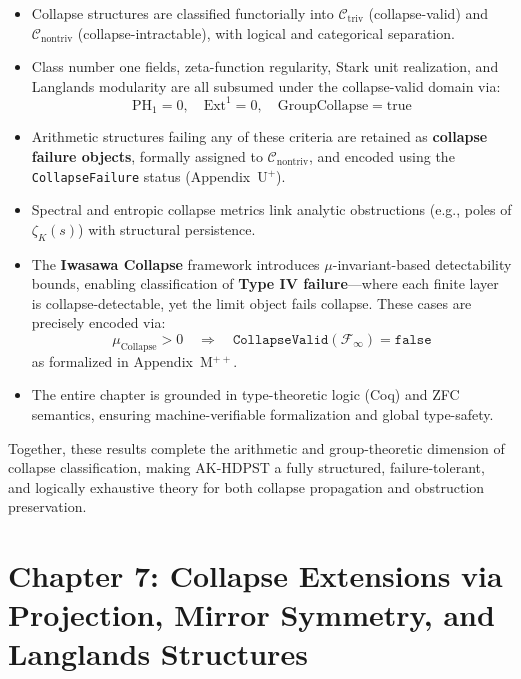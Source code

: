 \documentclass[11pt]{article}
\begin{document}
\begin{itemize}
    \item Collapse structures are classified functorially into \( \mathcal{C}_{\mathrm{triv}} \) (collapse-valid) and \( \mathcal{C}_{\mathrm{nontriv}} \) (collapse-intractable), with logical and categorical separation.
    \item Class number one fields, zeta-function regularity, Stark unit realization, and Langlands modularity are all subsumed under the collapse-valid domain via:
    \[
    \mathrm{PH}_1 = 0, \quad \mathrm{Ext}^1 = 0, \quad \mathrm{GroupCollapse} = \text{true}
    \]
    \item Arithmetic structures failing any of these criteria are retained as \textbf{collapse failure objects}, formally assigned to \( \mathcal{C}_{\mathrm{nontriv}} \), and encoded using the \texttt{CollapseFailure} status (Appendix~U$^+$).
    \item Spectral and entropic collapse metrics link analytic obstructions (e.g., poles of \( \zeta_K(s) \)) with structural persistence.
    \item The \textbf{Iwasawa Collapse} framework introduces $\mu$-invariant-based detectability bounds, enabling classification of \textbf{Type IV failure}—where each finite layer is collapse-detectable, yet the limit object fails collapse. These cases are precisely encoded via:
    \[
    \mu_{\mathrm{Collapse}} > 0 \quad \Rightarrow \quad \texttt{CollapseValid}(\mathcal{F}_\infty) = \texttt{false}
    \]
    as formalized in Appendix~M$^{++}$.
    \item The entire chapter is grounded in type-theoretic logic (Coq) and ZFC semantics, ensuring machine-verifiable formalization and global type-safety.
\end{itemize}

Together, these results complete the arithmetic and group-theoretic dimension of collapse classification, making AK-HDPST a fully structured, failure-tolerant, and logically exhaustive theory for both collapse propagation and obstruction preservation.



\section{Chapter 7: Collapse Extensions via Projection, Mirror Symmetry, and Langlands Structures}
\end{document}
